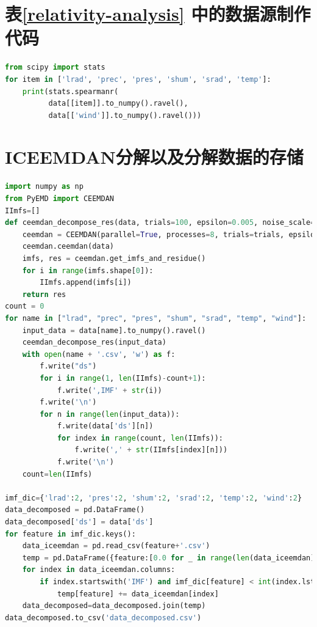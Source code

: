 \documentclass[AutoFakeBold]{LZUThesis}
\begin{document}
\section{表\ref{relativity-analysis} 中的数据源制作代码}

\begin{lstlisting}[language = python]
from scipy import stats
for item in ['lrad', 'prec', 'pres', 'shum', 'srad', 'temp']:
    print(stats.spearmanr(
          data[[item]].to_numpy().ravel(),
          data[['wind']].to_numpy().ravel()))
\end{lstlisting}

\section{ICEEMDAN分解以及分解数据的存储}

\begin{lstlisting}[language = python]
import numpy as np
from PyEMD import CEEMDAN
IImfs=[]
def ceemdan_decompose_res(data, trials=100, epsilon=0.005, noise_scale=1, noise_kind="normal", range_thr=0.01, total_power_thr=0.05):
    ceemdan = CEEMDAN(parallel=True, processes=8, trials=trials, epsilon=epsilon, noise_scale=noise_scale, noise_kind=noise_kind, range_thr=range_thr, total_power_thr=total_power_thr)
    ceemdan.ceemdan(data)
    imfs, res = ceemdan.get_imfs_and_residue()
    for i in range(imfs.shape[0]):
        IImfs.append(imfs[i])
    return res
count = 0
for name in ["lrad", "prec", "pres", "shum", "srad", "temp", "wind"]:
    input_data = data[name].to_numpy().ravel()
    ceemdan_decompose_res(input_data)
    with open(name + '.csv', 'w') as f:
        f.write("ds")
        for i in range(1, len(IImfs)-count+1):
            f.write(',IMF' + str(i))
        f.write('\n')
        for n in range(len(input_data)):
            f.write(data['ds'][n])
            for index in range(count, len(IImfs)):
                f.write(',' + str(IImfs[index][n]))
            f.write('\n')
    count=len(IImfs)

imf_dic={'lrad':2, 'pres':2, 'shum':2, 'srad':2, 'temp':2, 'wind':2}
data_decomposed = pd.DataFrame()
data_decomposed['ds'] = data['ds']
for feature in imf_dic.keys():
    data_iceemdan = pd.read_csv(feature+'.csv')
    temp = pd.DataFrame({feature:[0.0 for _ in range(len(data_iceemdan))]})
    for index in data_iceemdan.columns:
        if index.startswith('IMF') and imf_dic[feature] < int(index.lstrip('IMF')):
            temp[feature] += data_iceemdan[index]
    data_decomposed=data_decomposed.join(temp)
data_decomposed.to_csv('data_decomposed.csv')
\end{lstlisting}
\end{document}
